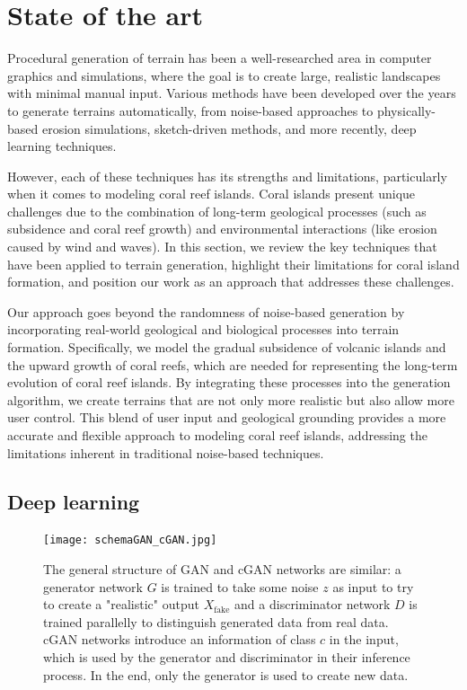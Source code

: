 \section{State of the art}
\label{sec:coral-island-SotA}
Procedural generation of terrain has been a well-researched area in computer graphics and simulations, where the goal is to create large, realistic landscapes with minimal manual input. Various methods have been developed over the years to generate terrains automatically, from noise-based approaches to physically-based erosion simulations, sketch-driven methods, and more recently, deep learning techniques.

However, each of these techniques has its strengths and limitations, particularly when it comes to modeling coral reef islands. Coral islands present unique challenges due to the combination of long-term geological processes (such as subsidence and coral reef growth) and environmental interactions (like erosion caused by wind and waves). In this section, we review the key techniques that have been applied to terrain generation, highlight their limitations for coral island formation, and position our work as an approach that addresses these challenges.


Our approach goes beyond the randomness of noise-based generation by incorporating real-world geological and biological processes into terrain formation. Specifically, we model the gradual subsidence of volcanic islands and the upward growth of coral reefs, which are needed for representing the long-term evolution of coral reef islands. By integrating these processes into the generation algorithm, we create terrains that are not only more realistic but also allow more user control. This blend of user input and geological grounding provides a more accurate and flexible approach to modeling coral reef islands, addressing the limitations inherent in traditional noise-based techniques.




\subsection{Deep learning}

\begin{figure}[ht]
	\centering
	\texttt{[image: schemaGAN\_cGAN.jpg]}
    \caption{The general structure of GAN and cGAN networks are similar: a generator network $G$ is trained to take some noise $z$ as input to try to create a "realistic" output $X_{\text{fake}}$ and a discriminator network $D$ is trained parallelly to distinguish generated data from real data. cGAN networks introduce an information of class $c$ in the input, which is used by the generator and discriminator in their inference process. In the end, only the generator is used to create new data. }
    \label{fig:coral-island-GAN-scheme}
\end{figure}

